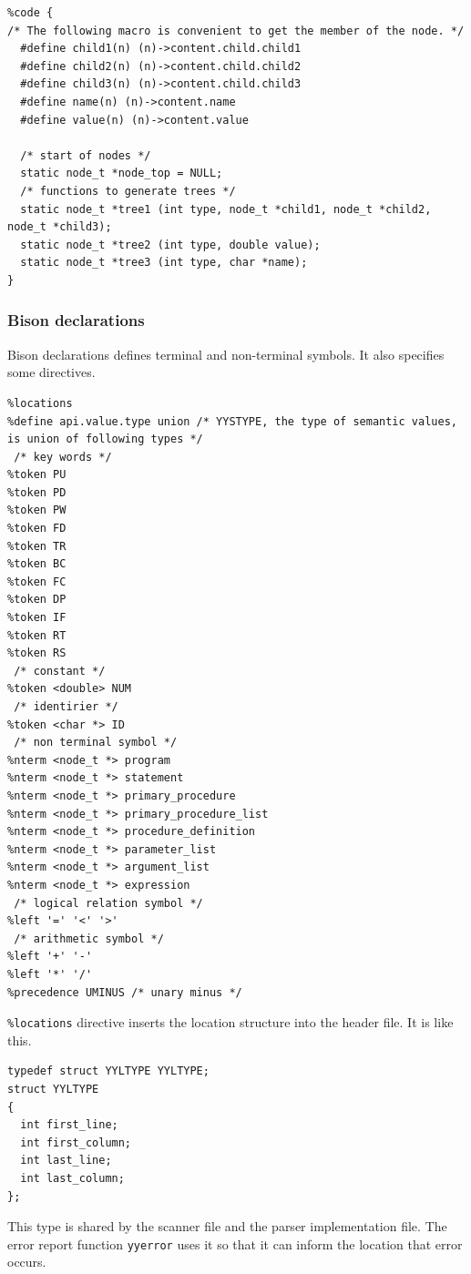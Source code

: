 \begin{lstlisting}
%code {
/* The following macro is convenient to get the member of the node. */
  #define child1(n) (n)->content.child.child1
  #define child2(n) (n)->content.child.child2
  #define child3(n) (n)->content.child.child3
  #define name(n) (n)->content.name
  #define value(n) (n)->content.value

  /* start of nodes */
  static node_t *node_top = NULL;
  /* functions to generate trees */
  static node_t *tree1 (int type, node_t *child1, node_t *child2, node_t *child3);
  static node_t *tree2 (int type, double value);
  static node_t *tree3 (int type, char *name);
}
\end{lstlisting}

\hypertarget{bison-declarations}{%
\subsubsection{Bison declarations}\label{bison-declarations}}

Bison declarations defines terminal and non-terminal symbols. It also
specifies some directives.

\begin{lstlisting}
%locations
%define api.value.type union /* YYSTYPE, the type of semantic values, is union of following types */
 /* key words */
%token PU
%token PD
%token PW
%token FD
%token TR
%token BC
%token FC
%token DP
%token IF
%token RT
%token RS
 /* constant */
%token <double> NUM
 /* identirier */
%token <char *> ID
 /* non terminal symbol */
%nterm <node_t *> program
%nterm <node_t *> statement
%nterm <node_t *> primary_procedure
%nterm <node_t *> primary_procedure_list
%nterm <node_t *> procedure_definition
%nterm <node_t *> parameter_list
%nterm <node_t *> argument_list
%nterm <node_t *> expression
 /* logical relation symbol */
%left '=' '<' '>'
 /* arithmetic symbol */
%left '+' '-'
%left '*' '/'
%precedence UMINUS /* unary minus */
\end{lstlisting}

\passthrough{\lstinline!\%locations!} directive inserts the location
structure into the header file. It is like this.

\begin{lstlisting}
typedef struct YYLTYPE YYLTYPE;
struct YYLTYPE
{
  int first_line;
  int first_column;
  int last_line;
  int last_column;
};
\end{lstlisting}

This type is shared by the scanner file and the parser implementation
file. The error report function \passthrough{\lstinline!yyerror!} uses
it so that it can inform the location that error occurs.

